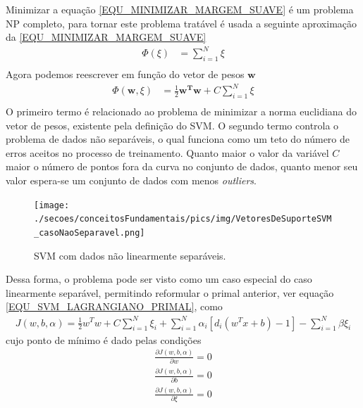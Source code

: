 Minimizar a equação \eqref{EQU_MINIMIZAR_MARGEM_SUAVE} é um problema NP completo, para tornar este problema tratável é usada a seguinte aproximação da \eqref{EQU_MINIMIZAR_MARGEM_SUAVE}
\begin{align}
\Phi(\xi) &= \sum\limits_{i=1}^{N} \xi \label{EQU_MINIMIZAR_MARGEM_SUAVE_APROX}\\
\end{align}
Agora podemos reescrever em função do vetor de pesos \(\mathbf{w}\)
\begin{align}
\Phi(\mathbf{w}, \xi) &= \frac{1}{2}\mathbf{w^{T}}\mathbf{w} + C\sum\limits_{i=1}^{N} \xi \label{EQU_MINIMIZAR_MARGEM_SUAVE_APROX_SVM}\\
\end{align}
O primeiro termo é relacionado ao problema de minimizar a norma euclidiana do vetor de pesos, existente pela definição do SVM. O segundo termo controla o problema de dados não separáveis, o qual funciona como um teto do número de erros aceitos no processo de treinamento. Quanto maior o valor da variável \(C\) maior o número de pontos fora da curva no conjunto de dados, quanto menor seu valor espera-se um conjunto de dados com menos \emph{outliers}.
\begin{figure}[hbt]
  \centering
  \caption{SVM com dados não linearmente separáveis.}
  \texttt{[image: ./secoes/conceitosFundamentais/pics/img/VetoresDeSuporteSVM\_casoNaoSeparavel.png]}
  \label{FIGURA_SVM_Caso_Nao_Separavel}
\end{figure}
Dessa forma, o problema pode ser visto como um caso especial do caso linearmente separável, permitindo reformular o primal anterior, ver equação \eqref{EQU_SVM_LAGRANGIANO_PRIMAL}, como
\begin{align}
J(w, b, \alpha) = \frac{1}{2}w^{T}w + C\sum\limits_{i=1}^{N}\xi_{i} + \sum\limits_{i=1}^{N} \alpha_{i}[d_{i}(w^{T}x + b) - 1] - \sum\limits_{i=1}^{N}\beta \xi_{i}  \label{EQU_SVM_LAGRANGIANO_PRIMAL_NAO_SEPARAVEL}
\end{align}
cujo ponto de mínimo é dado pelas condições
\begin{align}
 \frac{\partial J(w, b, \alpha)}{\partial w} = 0	\label{EQU_SVM_PONTO_SELA_W_NAO_SEPARAVEL}\\
 \frac{\partial J(w, b, \alpha)}{\partial b} = 0  	\label{EQU_SVM_PONTO_SELA_B_NAO_SEPARAVEL}\\
 \frac{\partial J(w, b, \alpha)}{\partial \xi} = 0  	\label{EQU_SVM_PONTO_SELA_xi_NAO_SEPARAVEL}
\end{align}
